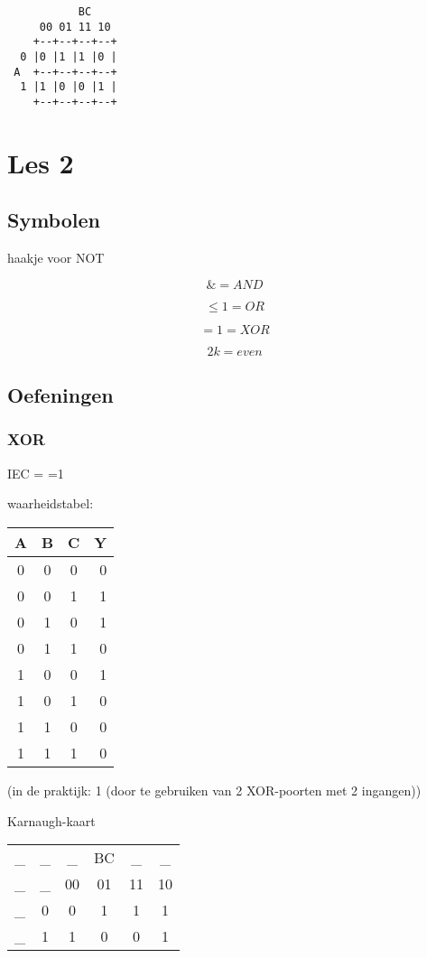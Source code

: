 \documentclass[11pt, a4paper]{article}
\begin{document}
\begin{verbatim}
    	   BC
     00 01 11 10
    +--+--+--+--+
  0 |0 |1 |1 |0 |
 A  +--+--+--+--+
  1 |1 |0 |0 |1 |
    +--+--+--+--+
\end{verbatim}


\newpage

\section{Les 2}

\subsection{Symbolen}

haakje voor NOT

$$\& = AND$$

$$\le1 = OR$$

$$=1 = XOR$$

$$2k = even$$

\subsection{Oefeningen}

\subsubsection{XOR}

IEC = =1

waarheidstabel:

\begin{tabular}{c c c || r}
A & B & C & Y \\
\hline
0 & 0 & 0 & 0 \\
0 & 0 & 1 & 1 \\
0 & 1 & 0 & 1 \\
0 & 1 & 1 & 0 \\
1 & 0 & 0 & 1 \\
1 & 0 & 1 & 0 \\
1 & 1 & 0 & 0 \\
1 & 1 & 1 & 0 \\
\end{tabular}

(in de praktijk: 1 (door te gebruiken van 2 XOR-poorten met 2 ingangen))

Karnaugh-kaart

\begin{tabular}{c c | c | c | c | c |}
  \_ & \_ & \_ & BC & \_ & \_\\
  \_ & \_ & 00 & 01 & 11 & 10 \\
   \hline
   \_ & 0 &  0 & 1 & 1 & 1 \\
   \hline
   \_ & 1 &  1 & 0 & 0 & 1 \\
   \hline
\end{tabular}
\end{document}
